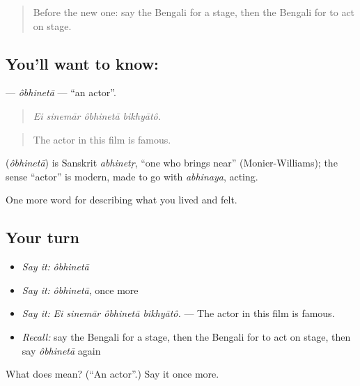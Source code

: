 \begin{quote}
Before the new one: say the Bengali for a stage, then the Bengali for to act on stage.
\end{quote}

\subsection*{You'll want to know: }
\textbf{} — \emph{ôbhinetā} — \textquotedblleft{}an actor\textquotedblright{}.

\begin{quote}
   
\end{quote}

\begin{quote}
\emph{Ei sinemār ôbhinetā bikhyātô.}
\end{quote}

\begin{quote}
The actor in this film is famous.
\end{quote}

\begin{cousinweb}
\textbf{} (\emph{ôbhinetā}) is Sanskrit \emph{abhinetṛ}, \textquotedblleft{}one who brings near\textquotedblright{} (Monier-Williams); the sense \textquotedblleft{}actor\textquotedblright{} is modern, made to go with \emph{abhinaya}, acting.
\end{cousinweb}

\begin{grammarlens}[title={What you've built}]
One more word for describing what you lived and felt.
\end{grammarlens}

\subsection*{Your turn}
\begin{itemize}
\raggedright
  \item \emph{Say it:} \emph{ôbhinetā}
  \item \emph{Say it:} \emph{ôbhinetā}, once more
  \item \emph{Say it:} \emph{Ei sinemār ôbhinetā bikhyātô.} — The actor in this film is famous.
  \item \emph{Recall:} say the Bengali for a stage, then the Bengali for to act on stage, then say \emph{ôbhinetā} again
\end{itemize}

\begin{tcolorbox}[breakable,colback=teal!4,colframe=teal!35!black,title={Before you move on}]
What does  mean? (\textquotedblleft{}An actor\textquotedblright{}.) Say it once more.
\end{tcolorbox}
